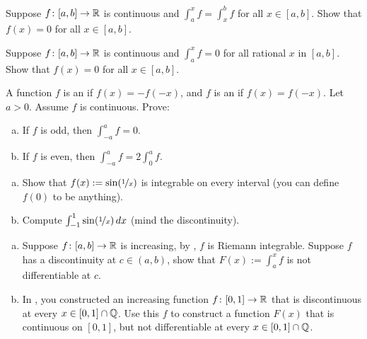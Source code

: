 \begin{exercise}
Suppose $f \colon [a,b] \to {\mathbb{R}}$ is continuous and
$\int_a^x f = \int_x^b f$ for all $x \in [a,b]$.  Show that $f(x) = 0$
for all $x \in [a,b]$.
\end{exercise}

\begin{exercise}
Suppose $f \colon [a,b] \to {\mathbb{R}}$ is continuous and
$\int_a^x f = 0$ for all rational $x$ in $[a,b]$.  Show that $f(x) = 0$
for all $x \in [a,b]$.
\end{exercise}

\begin{samepage}
\begin{exercise}
A function $f$ is an \emph{} if $f(x) = -f(-x)$,
and $f$ is an \emph{} if $f(x) = f(-x)$.  Let $a >
0$.  Assume $f$ is continuous.  Prove:
\begin{enumerate}[a)]
\item
If $f$ is odd, then $\int_{-a}^a f = 0$.
\item
If $f$ is even, then $\int_{-a}^a f = 2 \int_0^a f$.
\end{enumerate}
\end{exercise}
\end{samepage}

\begin{exercise}
\leavevmode
\begin{enumerate}[a)]
\item
Show that $f(x) := \sin(\nicefrac{1}{x})$
is integrable on every interval (you can define $f(0)$ to be anything).
\item
Compute $\int_{-1}^1 \sin(\nicefrac{1}{x})\,dx$ (mind the
discontinuity).
\end{enumerate}
\end{exercise}

\begin{exercise}
\leavevmode
\begin{enumerate}[a)]
\item
Suppose $f \colon [a,b] \to {\mathbb{R}}$ is increasing, by
,
$f$ is Riemann integrable.  Suppose $f$ has a discontinuity at $c \in
(a,b)$, show that $F(x) := \int_a^x f$ is not differentiable at $c$.
\item
In , you constructed an increasing
function $f \colon [0,1] \to {\mathbb{R}}$ that is discontinuous at every
$x \in [0,1] \cap {\mathbb{Q}}$.  Use this $f$ to construct a function $F(x)$ that is
continuous on $[0,1]$, but not differentiable at every $x \in [0,1] \cap {\mathbb{Q}}$.
\end{enumerate}
\end{exercise}

